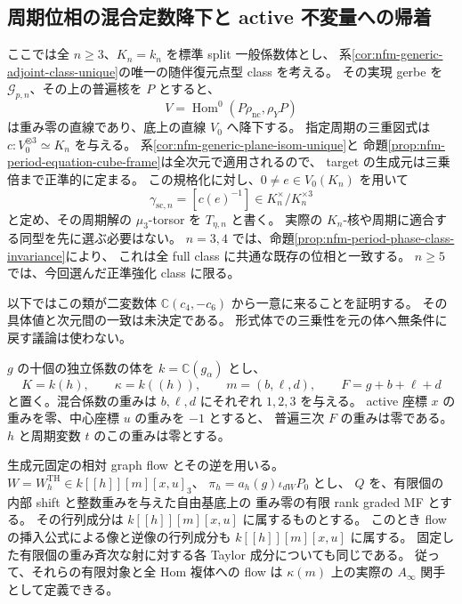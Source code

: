 \subsection{周期位相の混合定数降下と active 不変量への帰着}
\label{subsec:nfm-period-invariant-descent}

ここでは全 $n\ge3$、$K_n=k_n$ を標準 split 一般係数体とし、
系\ref{cor:nfm-generic-adjoint-class-unique}の唯一の随伴復元点型 class を考える。
その実現 gerbe を $\mathscr G_{p,n}$、その上の普遍核を $P$ とすると、
\[
 V=\operatorname{Hom}^0(P\rho_{\mathrm{nc}},\rho_Y P)
\]
は重み零の直線であり、底上の直線 $V_0$ へ降下する。
指定周期の三重図式は $c:V_0^{\otimes3}\simeq K_n$ を与える。
系\ref{cor:nfm-generic-plane-isom-unique}と
命題\ref{prop:nfm-period-equation-cube-frame}は全次元で適用されるので、
target の生成元は三乗倍まで正準的に定まる。
この規格化に対し、$0\ne e\in V_0(K_n)$ を用いて
\[
 \gamma_{\mathrm{sc},n}=[c(e)^{-1}]
       \in K_n^\times/K_n^{\times3}
\]
と定め、その周期解の $\mu_3$-torsor を $T_{\eta,n}$ と書く。
実際の $K_n$-核や周期に適合する同型を先に選ぶ必要はない。
$n=3,4$ では、命題\ref{prop:nfm-period-phase-class-invariance}により、
これは全 full class に共通な既存の位相と一致する。
$n\ge5$ では、今回選んだ正準強化 class に限る。

以下ではこの類が二変数体 $\mathbb C(c_4,-c_6)$ から一意に来ることを証明する。
その具体値と次元間の一致は未決定である。
形式体での三乗性を元の体へ無条件に戻す議論は使わない。

$g$ の十個の独立係数の体を $k=\mathbb C(g_\alpha)$ とし、
\[
 K=k(h),\qquad \kappa=k((h)),\qquad
 m=(b,\ell,d),\qquad F=g+b+\ell+d
\]
と置く。混合係数の重みは $b,\ell,d$ にそれぞれ $1,2,3$ を与える。
active 座標 $x$ の重みを零、中心座標 $u$ の重みを $-1$ とすると、
普遍三次 $F$ の重みは零である。$h$ と周期変数 $t$ のこの重みは零とする。

\begin{lemma}
\label{lem:nfm-period-flow-mixed-bound}
生成元固定の相対 graph flow とその逆を用いる。
$W=W_h^{\mathrm{TH}}\in k[[h]][m][x,u]_3$、
$\pi_h=a_h(g)\iota_{dW}P_0$ とし、
$Q$ を、有限個の内部 shift と整数重みを与えた自由基底上の
重み零の有限 rank graded MF とする。
その行列成分は $k[[h]][m][x,u]$ に属するものとする。
このとき flow の挿入公式による像と逆像の行列成分も
$k[[h]][m][x,u]$ に属する。
固定した有限個の重み斉次な射に対する各 Taylor 成分についても同じである。
従って、それらの有限対象と全 Hom 複体への flow は
$\kappa(m)$ 上の実際の $A_\infty$ 関手として定義できる。
\end{lemma}

